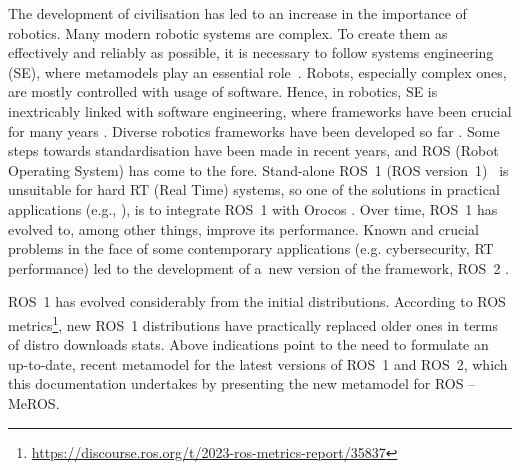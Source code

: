 \documentclass[11pt,oneside,a4paper]{report}
\begin{document}
	The development of civilisation has led to an increase in the importance of robotics. Many modern robotic systems are complex. To create them as effectively and reliably as possible, it is necessary to follow systems engineering (SE), where metamodels play an essential role~\cite{bezivin2004search,schmidt2006model,kent2002model}.
	Robots, especially complex ones, are mostly controlled with usage of software. Hence, in robotics, SE is inextricably linked with software engineering, where frameworks have been crucial for many years \cite{mnkandla2009software,shehory2014agent}.
	Diverse robotics frameworks have been developed so far \cite{inigo2012robotics,tsardoulias2017robotic,hentout2016survey}. Some steps towards standardisation have been made in recent years, and ROS (Robot Operating System) has come to the fore. Stand-alone ROS~1 (ROS version~1)~\cite{quigley2009ros} is unsuitable for hard RT (Real Time) systems, so one of the solutions in practical applications (e.g., \cite{lages2014architecture,buys2011haptic,pages2016tiago,Seredynski-fabric-romoco-2019,kornuta-bpan-2020,cholewinski2015software}), is to integrate ROS~1 with Orocos \cite{bruyninckx2001open,bruyninckx2002orocos}. Over time, ROS~1 has evolved to, among other things, improve its performance. Known and crucial problems in the face of some contemporary applications (e.g. cybersecurity, RT performance) led to the development of a~new version of the framework, ROS~2 \cite{maruyama2016exploring,park2020real}.   

	ROS~1 has evolved considerably from the initial distributions. According to ROS metrics\footnote{\url{https://discourse.ros.org/t/2023-ros-metrics-report/35837}}, new ROS~1 distributions have practically replaced older ones in terms of distro downloads stats. Above indications point to the need to formulate an up-to-date, recent metamodel for the latest versions of ROS~1 and ROS~2, which this documentation undertakes by presenting the new metamodel for ROS -- MeROS.
	
\end{document}
